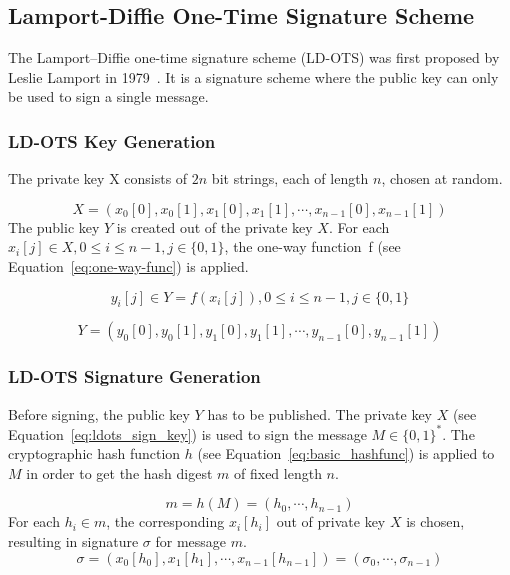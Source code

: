 \subsection{Lamport-Diffie One-Time Signature Scheme}
The Lamport–Diffie one-time signature scheme (LD-OTS) was first proposed by Leslie Lamport in 1979~\cite{lamport_signature_scheme_1979}. 
It is a signature scheme where the public key can only be used to sign a single message.


\subsubsection{LD-OTS Key Generation}
The private key X consists of $2n$ bit strings, each of length $n$, chosen at random. %

\begin{equation}
\label{eq:ldots_sign_key}
X = \left(x_{0}\left[0\right], x_{0}\left[1\right], x_{1}\left[0\right], x_{1}\left[1\right], \cdots, x_{n-1}\left[0\right], x_{n-1}\left[1\right] \right)
\end{equation}
The public key $Y$ is created out of the private key $X$. For each $x_i[j] \in X, 0 \leq i \leq n-1, j \in \lbrace 0,1 \rbrace$, the one-way function~f (see Equation~\ref{eq:one-way-func}) is applied.

\begin{equation}
y_i[j] \in Y = f(x_i[j]), 0 \leq i \leq n-1, j \in \lbrace 0,1 \rbrace
\end{equation}

\begin{equation}
Y = \left( 
y_{0}\left[0\right], y_{0}\left[1 \right], y_{1}\left[0\right], y_{1}\left[1\right], \cdots, y_{n-1}\left[0\right], y_{n-1}\left[1\right]
\right)
\end{equation}

\subsubsection{LD-OTS Signature Generation} %
Before signing, the public key $Y$ has to be published.
The private key $X$ (see Equation~\ref{eq:ldots_sign_key}) is used to sign the message $M \in \lbrace 0,1 \rbrace^*$. 
The cryptographic hash function $h$ (see Equation~\ref{eq:basic_hashfunc}) is applied to $M$ in order to get the hash digest $m$ of fixed length $n$.

\begin{equation}
\label{eq:hash_message}
m = h(M) = (h_{0}, \cdots, h_{n-1})
\end{equation} %
For each $h_i \in m$, the corresponding $x_i[h_i]$ out of private key $X$ is chosen, resulting in signature $\sigma$ for message $m$.
\begin{equation}
\sigma = \left(
x_0 \left[ h_0 \right], x_1\left[ h_1 \right], \cdots, x_{n-1}\left[ h_{n-1}\right]
\right) = (\sigma_0, \cdots, \sigma_{n-1})
\end{equation}

